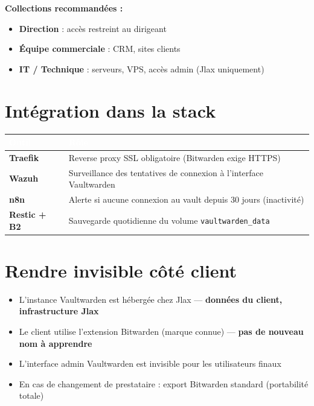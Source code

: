 \documentclass[11pt, a4paper]{article}
\begin{document}
\textbf{Collections recommandées :}
\begin{itemize}
  \item \textbf{Direction} : accès restreint au dirigeant
  \item \textbf{Équipe commerciale} : CRM, sites clients
  \item \textbf{IT / Technique} : serveurs, VPS, accès admin (Jlax uniquement)
\end{itemize}

\section{Intégration dans la stack}

\begin{center}
\renewcommand{\arraystretch}{1.4}
\begin{tabularx}{\linewidth}{>{\bfseries}p{2.8cm} X}
\toprule
\rowcolor{tabheader}
\textcolor{white}{\textbf{Outil}} & \textcolor{white}{\textbf{Rôle}} \\
\midrule
Traefik & Reverse proxy SSL obligatoire (Bitwarden exige HTTPS) \\
\rowcolor{rowgray}
Wazuh & Surveillance des tentatives de connexion à l'interface Vaultwarden \\
n8n & Alerte si aucune connexion au vault depuis 30 jours (inactivité) \\
\rowcolor{rowgray}
Restic + B2 & Sauvegarde quotidienne du volume \texttt{vaultwarden\_data} \\
\bottomrule
\end{tabularx}
\end{center}

\section{Rendre invisible côté client}

\begin{itemize}
  \item L'instance Vaultwarden est hébergée chez Jlax — \textbf{données du client, infrastructure Jlax}
  \item Le client utilise l'extension Bitwarden (marque connue) — \textbf{pas de nouveau nom à apprendre}
  \item L'interface admin Vaultwarden est invisible pour les utilisateurs finaux
  \item En cas de changement de prestataire : export Bitwarden standard (portabilité totale)
\end{itemize}
\end{document}
